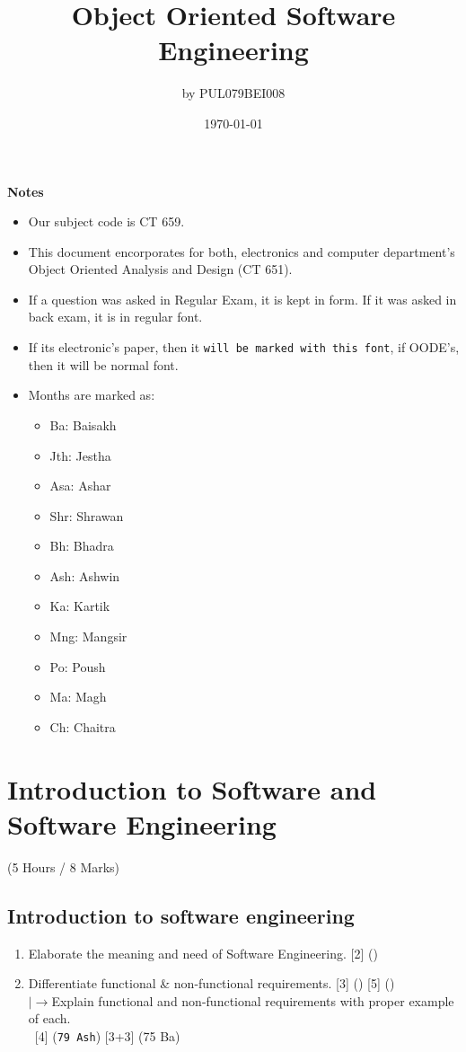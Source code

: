 \documentclass[12pt]{article}
\title{Object Oriented Software Engineering}
\author{by PUL079BEI008}
\date{\today}
\newcommand{\lb}{\\$\left|\rightarrow\right.$}
\newcommand{\enter}{\\\textcolor{white}{1}}
\begin{document}
\maketitle
\vspace{8.5cm}
\textbf{Notes}
\begin{itemize}[noitemsep]
	\item Our subject code is CT 659.
	\item This document encorporates for both, electronics and computer department's Object Oriented Analysis and Design (CT 651).
	\item If a question was asked in Regular Exam, it is kept in  form. If it was asked in back exam, it is in regular font.
  \item If its electronic's paper, then it \texttt{will be marked with this font}, if OODE's, then it will be normal font.
	\item Months are marked as: 
	\begin{itemize}[noitemsep, topsep=0pt]
		\item Ba: Baisakh
		\item Jth: Jestha
		\item Asa: Ashar
		\item Shr: Shrawan
		\item Bh: Bhadra
		\item Ash: Ashwin
		\item Ka: Kartik
		\item Mng: Mangsir
		\item Po: Poush
		\item Ma: Magh
		\item Ch: Chaitra
	\end{itemize}
\end{itemize}
\pagebreak
\tableofcontents
\pagebreak

\section{Introduction to Software and Software Engineering}
  \begin{center} (5 Hours / 8 Marks) \end{center}
 
  \subsection{Introduction to software engineering}
    \begin{enumerate}
      \item Elaborate the meaning and need of Software Engineering. \hfill [2] ()

      \item Differentiate functional \& non-functional requirements. \hfill [3] () [5] ()
        \lb Explain functional and non-functional requirements with proper example of each.
        \enter\hfill [4] (\texttt{79 Ash}) [3+3] (75 Ba)
    \end{enumerate}
\end{document}
